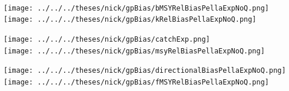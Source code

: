 \documentclass[ xcolor = pdftex, dvipsnames, table ]{beamer}
\begin{document}
{%
\begin{frame}%
$~$
\hspace*{-1.25cm}
\begin{minipage}[h!]{0.33\textwidth}
\hspace*{0.25cm}
\texttt{[image: ../../../theses/nick/gpBias/bMSYRelBiasPellaExpNoQ.png]}\\
\hspace*{0.25cm}
\texttt{[image: ../../../theses/nick/gpBias/kRelBiasPellaExpNoQ.png]}
\end{minipage}
\begin{minipage}[h!]{0.33\textwidth}
\hspace*{0.75cm}
\texttt{[image: ../../../theses/nick/gpBias/catchExp.png]}\\
\hspace*{0.75cm}
\texttt{[image: ../../../theses/nick/gpBias/msyRelBiasPellaExpNoQ.png]}
\end{minipage}
\begin{minipage}[h!]{0.33\textwidth}
\hspace*{1cm}
\texttt{[image: ../../../theses/nick/gpBias/directionalBiasPellaExpNoQ.png]}\\
\hspace*{1cm}
\texttt{[image: ../../../theses/nick/gpBias/fMSYRelBiasPellaExpNoQ.png]}
\end{minipage}
\end{frame}

}
\end{document}
